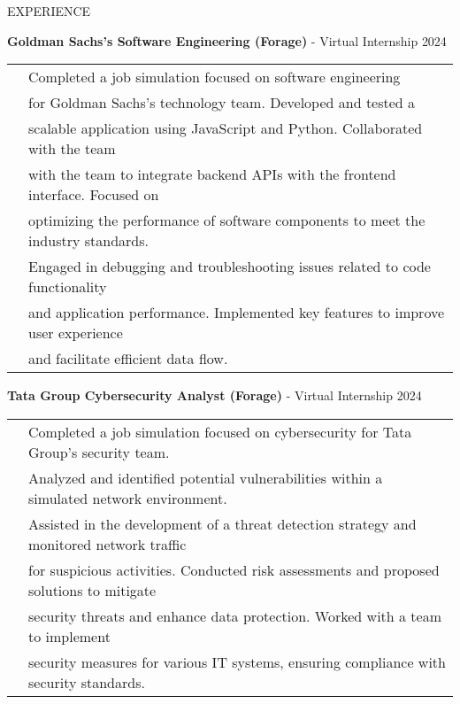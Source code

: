 \documentclass{resume}
\begin{document}
\begin{rSection}{EXPERIENCE}
    \begin{itemize}
        {\bf Goldman Sachs's Software Engineering (Forage)} - Virtual Internship \hfill {2024}\\
        \begin{tabular}{>{\bfseries}l l}
            \textbf{} & Completed a job simulation focused on software engineering \\ &for Goldman Sachs's technology team. Developed and tested a \\
            & scalable application using JavaScript and Python. Collaborated with the team\\
            & with the team to integrate backend APIs with the frontend interface. Focused on\\
            & optimizing the performance of software components to meet the industry standards. \\
            & Engaged in debugging and troubleshooting issues related to code functionality  \\
            & and application performance. Implemented key features to improve user experience \\ &and facilitate efficient data flow. \\
        \end{tabular}
    \end{itemize}
    \begin{itemize}
        {\bf Tata Group Cybersecurity Analyst (Forage)} - Virtual Internship \hfill {2024}\\
        \begin{tabular}{>{\bfseries}l l}
            \textbf{} & Completed a job simulation focused on cybersecurity for Tata Group's security team. \\
            & Analyzed and identified potential vulnerabilities within a simulated network environment. \\
            & Assisted in the development of a threat detection strategy and monitored network traffic \\ & for suspicious activities. Conducted risk assessments and proposed solutions to mitigate\\
            & security threats and enhance data protection. Worked with a team to implement\\
            & security measures for various IT systems, ensuring compliance with security standards. \\
        \end{tabular}
    \end{itemize}
    
\end{rSection}
\end{document}

